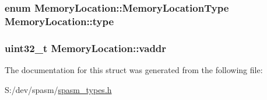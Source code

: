 \label{struct_memory_location_ad8776d9c07ac1dfafd46fc571800268a}
\hypertarget{struct_memory_location_a2736152232b8c5033a0ec806877105db}{
\subsubsection[{type}]{\setlength{\rightskip}{0pt plus 5cm}enum {\bf \-Memory\-Location\-::\-Memory\-Location\-Type}  {\bf \-Memory\-Location\-::type}}}
\label{struct_memory_location_a2736152232b8c5033a0ec806877105db}
\hypertarget{struct_memory_location_a925b7416925925d465bbbc162bb3bc4c}{
\subsubsection[{vaddr}]{\setlength{\rightskip}{0pt plus 5cm}uint32\-\_\-t {\bf \-Memory\-Location\-::vaddr}}}
\label{struct_memory_location_a925b7416925925d465bbbc162bb3bc4c}


\-The documentation for this struct was generated from the following file\-:\begin{DoxyCompactItemize}
\item 
\-S\-:/dev/spasm/\hyperlink{spasm__types_8h}{spasm\-\_\-types.\-h}\end{DoxyCompactItemize}
